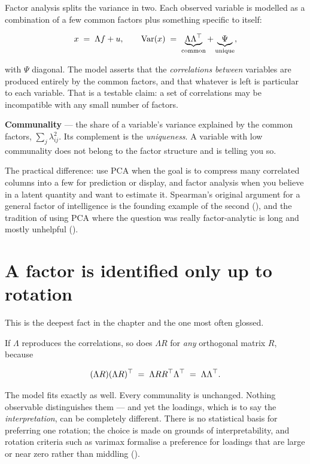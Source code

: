 \documentclass[
  letterpaper,
  10pt,
  twoside,
  openright,
  numbers=noenddot,
  chapterprefix=true]{scrbook}
\begin{document}
Factor analysis splits the variance in two. Each observed variable is
modelled as a combination of a few common factors plus something
specific to itself:

\[
x \thickspace=\thickspace \Lambda f + u,
\qquad
\mathrm{Var}(x) \thickspace=\thickspace \underbrace{\Lambda \Lambda^\top}_{\text{common}} + \underbrace{\Psi}_{\text{unique}},
\]

with \(\Psi\) diagonal. The model asserts that the \emph{correlations
between} variables are produced entirely by the common factors, and that
whatever is left is particular to each variable. That is a testable
claim: a set of correlations may be incompatible with any small number
of factors.

\begin{qmibdefinition}

{\textbf{Communality}} --- the share of a variable's variance explained
by the common factors, \(\sum_j \lambda_{ij}^2\). Its complement is the
\emph{uniqueness}. A variable with low communality does not belong to
the factor structure and is telling you so.

\end{qmibdefinition}

The practical difference: use PCA when the goal is to compress many
correlated columns into a few for prediction or display, and factor
analysis when you believe in a latent quantity and want to estimate it.
Spearman's original argument for a general factor of intelligence is the
founding example of the second (), and the tradition of using PCA where the question was really
factor-analytic is long and mostly unhelpful
().

\section{A factor is identified only up to
rotation}\label{a-factor-is-identified-only-up-to-rotation}

This is the deepest fact in the chapter and the one most often glossed.

If \(\Lambda\) reproduces the correlations, so does \(\Lambda R\) for
\emph{any} orthogonal matrix \(R\), because

\[
(\Lambda R)(\Lambda R)^\top \thickspace=\thickspace \Lambda R R^\top \Lambda^\top \thickspace=\thickspace \Lambda \Lambda^\top .
\]

The model fits exactly as well. Every communality is unchanged. Nothing
observable distinguishes them --- and yet the loadings, which is to say
the \emph{interpretation}, can be completely different. There is no
statistical basis for preferring one rotation; the choice is made on
grounds of interpretability, and rotation criteria such as varimax
formalise a preference for loadings that are large or near zero rather
than middling ().
\end{document}

